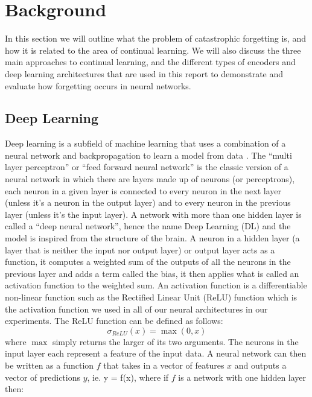 \section{Background}
In this section we will outline what the problem of catastrophic forgetting is, and how it is related to the area of continual learning. We will also discuss the three main approaches to continual learning, and the different types of encoders and deep learning architectures that are used in this report to demonstrate and evaluate how forgetting occurs in neural networks. 

\subsection{Deep Learning}
\label{subsec:DL}
Deep learning is a subfield of machine learning that uses a combination of a neural network and backpropagation to learn a model from data \cite{lecun2015deep,rumelhart1986learning,Goodfellow-et-al-2016,schmidhuber2015deep}. The  ``multi layer perceptron'' or ``feed forward neural network'' is the classic version of a neural network in which there are layers made up of neurons (or perceptrons), each neuron in a given layer is connected to every neuron in the next layer (unless it's a neuron in the output layer) and to every neuron in the previous layer (unless it's the input layer). A network with more than one hidden layer is called a ``deep neural network'', hence the name Deep Learning (DL) and the model is inspired from the structure of the brain. A neuron in a hidden layer (a layer that is neither the input nor output layer) or output layer acts as a function, it computes a weighted sum of the outputs of all the neurons in the previous layer and adds a term called the bias, it then applies what is called an activation function to the weighted sum. An activation function is a differentiable non-linear function such as the Rectified Linear Unit (ReLU) function \cite{nair2010rectified} which is the activation function we used in all of our neural architectures in our experiments. The ReLU function can be defined as follows:
\begin{equation}
    \sigma_{ReLU}(x) = \max(0,x)
\end{equation} 
where $\max$ simply returns the larger of its two arguments. The neurons in the input layer each represent a feature of the input data. A neural network can then be written as a function $f$ that takes in a vector of features $x$ and outputs a vector of predictions $y$, ie. y = f(x), where if $f$ is a network with one hidden layer then:
